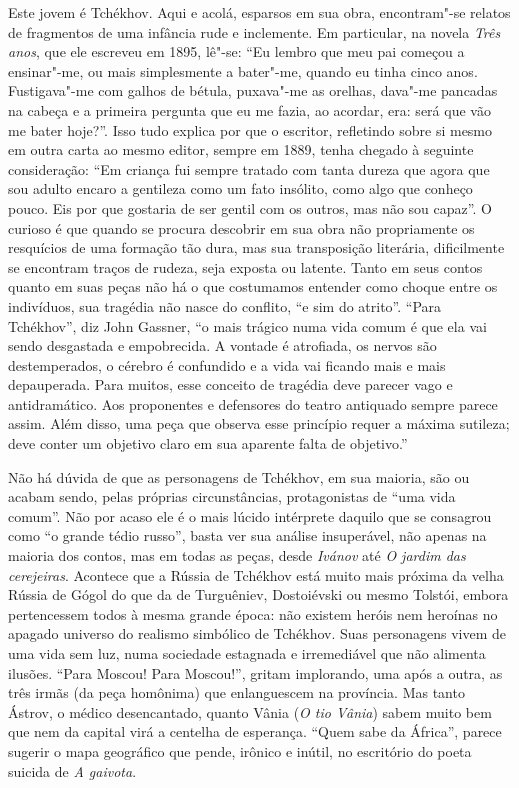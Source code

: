 Este jovem é Tchékhov. Aqui e acolá, esparsos em sua obra,
encontram"-se relatos de fragmentos de uma infância rude e
inclemente. Em particular, na novela \emph{Três anos}, que
ele escreveu em 1895, lê"-se: ``Eu lembro que meu pai começou
a ensinar"-me, ou mais simplesmente a bater"-me, quando eu
tinha cinco anos. Fustigava"-me com galhos de bétula, puxava"-me
as orelhas, dava"-me pancadas na cabeça e a primeira pergunta que
eu me fazia, ao acordar, era: será que vão me bater hoje?''. Isso
tudo explica por que o escritor, refletindo sobre si mesmo em
outra carta ao mesmo editor, sempre em 1889, tenha chegado à
seguinte consideração: ``Em criança fui sempre tratado com
tanta dureza que agora que sou adulto encaro a gentileza como
um fato insólito, como algo que conheço pouco. Eis por que
gostaria de ser gentil com os outros, mas não sou capaz''.
O curioso é que quando se procura descobrir em sua obra não
propriamente os resquícios de uma formação tão dura, mas sua
transposição literária, dificilmente se encontram traços de
rudeza, seja exposta ou latente. Tanto em seus contos quanto
em suas peças não há o que costumamos entender como choque
entre os indivíduos, sua tragédia não nasce do conflito, ``e sim
do atrito''. ``Para Tchékhov'', diz John Gassner, ``o mais
trágico numa vida comum é que ela vai sendo desgastada e
empobrecida. A vontade é atrofiada, os nervos são destemperados,
o cérebro é confundido e a vida vai ficando mais e mais
depauperada. Para muitos, esse conceito de tragédia deve parecer
vago e antidramático. Aos proponentes e defensores do teatro
antiquado sempre parece assim. Além disso, uma peça que observa
esse princípio requer a máxima sutileza; deve conter um objetivo
claro em sua aparente falta de objetivo.''

Não há dúvida de que as personagens de Tchékhov, em sua maioria,
são ou acabam sendo, pelas próprias circunstâncias, protagonistas
de ``uma vida comum''. Não por acaso ele é o mais lúcido
intérprete daquilo que se consagrou como ``o grande tédio russo'',
basta ver sua análise insuperável, não apenas na maioria dos contos,
mas em todas as peças, desde \emph{Ivánov} até \emph{O jardim das
cerejeiras}. Acontece que a Rússia de Tchékhov está muito mais
próxima da velha Rússia de Gógol do que da de Turguêniev,
Dostoiévski ou mesmo Tolstói, embora pertencessem todos à mesma
grande época: não existem heróis nem heroínas no apagado universo
do realismo simbólico de Tchékhov. Suas personagens vivem de uma
vida sem luz, numa sociedade estagnada e irremediável que não
alimenta ilusões. ``Para Moscou! Para Moscou!'', gritam implorando,
uma após a outra, as três irmãs (da peça homônima) que enlanguescem
na província. Mas tanto Ástrov, o médico desencantado, quanto Vânia
(\emph{O tio Vânia}) sabem muito bem que nem da capital virá a
centelha de esperança. ``Quem sabe da África'', parece sugerir o
mapa geográfico que pende, irônico e inútil, no escritório do poeta
suicida de \emph{A gaivota}.

